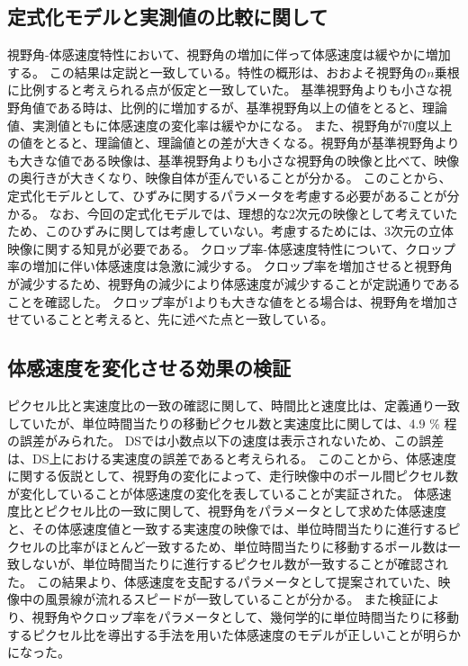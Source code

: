 \subsection{定式化モデルと実測値の比較に関して}
視野角-体感速度特性において、視野角の増加に伴って体感速度は緩やかに増加する。
この結果は定説と一致している。特性の概形は、おおよそ視野角の$n$乗根に比例すると考えられる点が仮定と一致していた。
基準視野角よりも小さな視野角値である時は、比例的に増加するが、基準視野角以上の値をとると、理論値、実測値ともに体感速度の変化率は緩やかになる。
また、視野角が70度以上の値をとると、理論値と、理論値との差が大きくなる。視野角が基準視野角よりも大きな値である映像は、基準視野角よりも小さな視野角の映像と比べて、映像の奥行きが大きくなり、映像自体が歪んでいることが分かる。
このことから、定式化モデルとして、ひずみに関するパラメータを考慮する必要があることが分かる。
なお、今回の定式化モデルでは、理想的な2次元の映像として考えていたため、このひずみに関しては考慮していない。考慮するためには、3次元の立体映像に関する知見が必要である。
クロップ率-体感速度特性について、クロップ率の増加に伴い体感速度は急激に減少する。
クロップ率を増加させると視野角が減少するため、視野角の減少により体感速度が減少することが定説通りであることを確認した。
クロップ率が1よりも大きな値をとる場合は、視野角を増加させていることと考えると、先に述べた点と一致している。

\subsection{体感速度を変化させる効果の検証}
ピクセル比と実速度比の一致の確認に関して、時間比と速度比は、定義通り一致していたが、単位時間当たりの移動ピクセル数と実速度比に関しては、4.9 \% 程の誤差がみられた。
DSでは小数点以下の速度は表示されないため、この誤差は、DS上における実速度の誤差であると考えられる。
このことから、体感速度に関する仮説として、視野角の変化によって、走行映像中のポール間ピクセル数が変化していることが体感速度の変化を表していることが実証された。
体感速度比とピクセル比の一致に関して、視野角をパラメータとして求めた体感速度と、その体感速度値と一致する実速度の映像では、単位時間当たりに進行するピクセルの比率がほとんど一致するため、単位時間当たりに移動するポール数は一致しないが、単位時間当たりに進行するピクセル数が一致することが確認された。
この結果より、体感速度を支配するパラメータとして提案されていた、映像中の風景線が流れるスピードが一致していることが分かる。
また検証により、視野角やクロップ率をパラメータとして、幾何学的に単位時間当たりに移動するピクセル比を導出する手法を用いた体感速度のモデルが正しいことが明らかになった。

